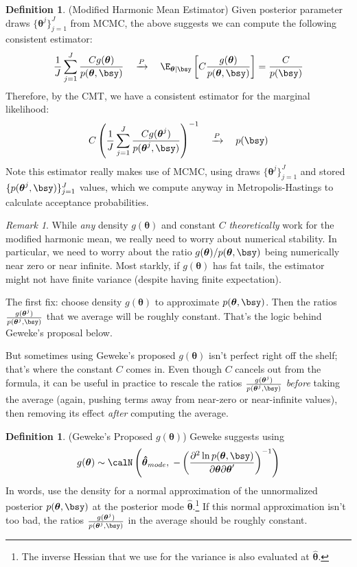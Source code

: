 \documentclass[12pt]{article}
\theoremstyle{plain}
\theoremstyle{definition}
\newtheorem{defn}[thm]{Definition}
\theoremstyle{remark}
\newtheorem*{rmk}{Remark}
\newcommand{\bstheta}{\boldsymbol{\theta}}
\newcommand{\bshattheta}{\boldsymbol{\hat{\theta}}}
\newcommand{\pto}{\xrightarrow{P}}
\begin{document}
\begin{defn}(Modified Harmonic Mean Estimator)
Given posterior parameter draws $\{\bstheta^j\}_{j=1}^J$ from MCMC, the
above suggests we can compute the following consistent estimator:
\begin{align*}
  \frac{1}{J}\sum_{j=1}^J
  \frac{Cg(\bstheta)}{p(\bstheta,\bsy)}
  \quad\pto\quad
  \E_{\bstheta|\bsy}\left[
    C\frac{g(\bstheta)}{p(\bstheta,\bsy)}
  \right]
  =
  \frac{C}{p(\bsy)}
\end{align*}
Therefore, by the CMT, we have a consistent estimator for the marginal
likelihood:
\begin{align*}
  C
  \left(
  \frac{1}{J}\sum_{j=1}^J
  \frac{Cg(\bstheta^j)}{p(\bstheta^j,\bsy)}
  \right)^{-1}
  \quad\pto\quad
  p(\bsy)
\end{align*}
Note this estimator really makes use of MCMC, using draws
$\{\bstheta^j\}_{j=1}^J$ and stored $\{p(\bstheta^j,\bsy)\}_{j=1}^J$
values, which we compute anyway in Metropolis-Hastings to calculate
acceptance probabilities.
\end{defn}
\begin{rmk}
While \emph{any} density $g(\bstheta)$ and constant $C$
\emph{theoretically} work for the modified harmonic mean, we really need
to worry about numerical stability.
In particular, we need to worry about the ratio
$g(\bstheta)/p(\bstheta,\bsy)$ being numerically near zero or near
infinite.
Most starkly, if $g(\bstheta)$ has fat tails, the estimator might not
have finite variance (despite having finite expectation).

The first fix: choose density $g(\bstheta)$ to approximate
$p(\bstheta,\bsy)$. Then the ratios
$\frac{g(\bstheta^j)}{p(\bstheta^j,\bsy)}$ that we average will be
roughly constant.  That's the logic behind Geweke's proposal below.

But sometimes using Geweke's proposed $g(\bstheta)$ isn't perfect right
off the shelf; that's where the constant $C$ comes in.
Even though $C$ cancels out from the formula, it can be useful in
practice to rescale the ratios
$\frac{g(\bstheta^j)}{p(\bstheta^j,\bsy)}$ \emph{before} taking the
average (again, pushing terms away from near-zero or near-infinite
values), then removing its effect \emph{after} computing the average.
\end{rmk}

\begin{defn}(Geweke's Proposed $g(\bstheta)$)
Geweke suggests using
\begin{align*}
  g(\bstheta)
  \sim
  \calN\left(
  \bshattheta_{mode},\;
  -\left(
  \frac{\partial^2 \ln
  p(\bstheta,\bsy)}{\partial\bstheta\partial\bstheta'}
  \right)^{-1}
  \right)
\end{align*}
In words, use the density for a normal approximation of the
unnormalized posterior $p(\bstheta,\bsy)$ at the posterior mode
$\bshattheta$.\footnote{%
  The inverse Hessian that we use for the variance is also evaluated at
  $\bshattheta$.
}
If this normal approximation isn't too bad, the ratios
$\frac{g(\bstheta^j)}{p(\bstheta^j,\bsy)}$ in the average should be
roughly constant.
\end{defn}
\end{document}
